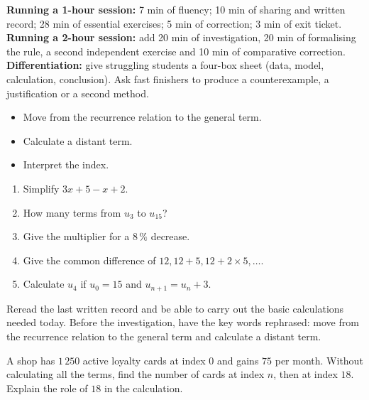     \ifprof
    \begin{methode}
    \textbf{Running a 1-hour session:} 7 min of fluency; 10 min of sharing and written record; 28 min of essential exercises; 5 min of correction; 3 min of exit ticket.\\
    \textbf{Running a 2-hour session:} add 20 min of investigation, 20 min of formalising the rule, a second independent exercise and 10 min of comparative correction.\\
    \textbf{Differentiation:} give struggling students a four-box sheet (data, model, calculation, conclusion). Ask fast finishers to produce a counterexample, a justification or a second method.
    \end{methode}
    \fi
{}
\begin{objectifs}\begin{itemize}\item Move from the recurrence relation to the general term.\item Calculate a distant term.\item Interpret the index.\end{itemize}\end{objectifs}
\begin{automatismes}\begin{enumerate}\item Simplify $3x+5-x+2$. \item How many terms from $u_3$ to $u_{15}$? \item Give the multiplier for a $8\,\%$ decrease. \item Give the common difference of $12,12+5,12+2\times5,\ldots$. \item Calculate $u_4$ if $u_0=15$ and $u_{n+1}=u_n+3$. \end{enumerate}\end{automatismes}
\begin{prerequis}Reread the last written record and be able to carry out the basic calculations needed today. Before the investigation, have the key words rephrased: move from the recurrence relation to the general term and calculate a distant term.\end{prerequis}

\begin{activite}
A shop has $1\,250$ active loyalty cards at index $0$ and gains $75$ per month. Without calculating all the terms, find the number of cards at index $n$, then at index $18$. Explain the role of $18$ in the calculation.

\end{activite}

